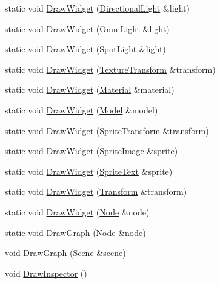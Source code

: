 \begin{DoxyCompactItemize}
\item 
static void \hyperlink{namespacemage_1_1editor_aef32dcc2d0eea998af9d9a0f59d1bb29}{Draw\+Widget} (\hyperlink{classmage_1_1_directional_light}{Directional\+Light} \&light)
\item 
static void \hyperlink{namespacemage_1_1editor_a8012cb9cb72a5daafccb06bcf70ad75f}{Draw\+Widget} (\hyperlink{classmage_1_1_omni_light}{Omni\+Light} \&light)
\item 
static void \hyperlink{namespacemage_1_1editor_ad905a3a02d4abac8d53987f027bdf172}{Draw\+Widget} (\hyperlink{classmage_1_1_spot_light}{Spot\+Light} \&light)
\item 
static void \hyperlink{namespacemage_1_1editor_a756fb73ee6d0c207c1bf9c317ca5c3be}{Draw\+Widget} (\hyperlink{classmage_1_1_texture_transform}{Texture\+Transform} \&transform)
\item 
static void \hyperlink{namespacemage_1_1editor_ac832c9e938c5f40096064ec44dbbe955}{Draw\+Widget} (\hyperlink{classmage_1_1_material}{Material} \&material)
\item 
static void \hyperlink{namespacemage_1_1editor_a3cc4349fe745bfbb06d4a662fc6c1437}{Draw\+Widget} (\hyperlink{classmage_1_1_model}{Model} \&model)
\item 
static void \hyperlink{namespacemage_1_1editor_acfb55dbd52c9f41f778cdbce6c551bd3}{Draw\+Widget} (\hyperlink{classmage_1_1_sprite_transform}{Sprite\+Transform} \&transform)
\item 
static void \hyperlink{namespacemage_1_1editor_ac52d7465a1b9bc40a1b446decc7bd4b3}{Draw\+Widget} (\hyperlink{classmage_1_1_sprite_image}{Sprite\+Image} \&sprite)
\item 
static void \hyperlink{namespacemage_1_1editor_a64511af584a39f949d3c5a548adde050}{Draw\+Widget} (\hyperlink{classmage_1_1_sprite_text}{Sprite\+Text} \&sprite)
\item 
static void \hyperlink{namespacemage_1_1editor_a522fbfe5aa8ada8eb3ebf0c40e02ef1d}{Draw\+Widget} (\hyperlink{classmage_1_1_transform}{Transform} \&transform)
\item 
static void \hyperlink{namespacemage_1_1editor_a5687225a5c6ea498168c394df0d50410}{Draw\+Widget} (\hyperlink{classmage_1_1_node}{Node} \&node)
\item 
static void \hyperlink{namespacemage_1_1editor_a73bdc66f67454e7178d83f1bf32d273c}{Draw\+Graph} (\hyperlink{classmage_1_1_node}{Node} \&node)
\item 
void \hyperlink{namespacemage_1_1editor_aeff2b7b5e4be51f68c9c4a6b7a1f411a}{Draw\+Graph} (\hyperlink{classmage_1_1_scene}{Scene} \&scene)
\item 
void \hyperlink{namespacemage_1_1editor_a2bd3932d0c7f95a953f3dd5d3f6870dd}{Draw\+Inspector} ()
\end{DoxyCompactItemize}
